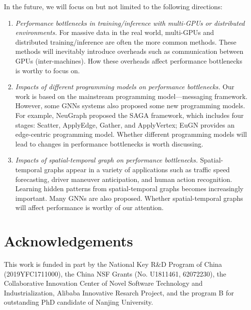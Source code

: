In the future, we will focus on but not limited to the following directions:
%
\begin{enumerate}
    \item \emph{Performance bottlenecks in training/inference with multi-GPUs or distributed environments.}
    For massive data in the real world, multi-GPUs and distributed training/inference are often the more common methods\cite{zhang2020_analysis_neugraph, zhu2019_aligraph}.
    These methods will inevitably introduce overheads such as communication between GPUs (inter-machines). 
    How these overheads affect performance bottlenecks is worthy to focus on.
    \item \emph{Impacts of different programming models on performance bottlenecks.}
    Our work is based on the mainstream programming model---messaging framework.
    However, some GNNs systems also proposed some new programming models.
    For example, NeuGraph\cite{zhang2020_analysis_neugraph} proposed the SAGA framework, 
    which includes four stages: Scatter, ApplyEdge, Gather, and ApplyVertex;
    EuGN\cite{he2019_EnGN} provides an edge-centric programming model.
    Whether different programming models will lead to changes in performance bottlenecks is worth discussing.
    \item \emph{Impacts of spatial-temporal graph on performance bottlenecks.}
    Spatial-temporal graphs appear in a variety of applications such as traffic speed forecasting\cite{li2018_DCRNN}, 
    driver maneuver anticipation\cite{jain2016_SRNN}, and human action recognition\cite{yan2018_STGCN}.
    Learning hidden patterns from spatial-temporal graphs becomes increasingly important.
    Many GNNs are also proposed\cite{li2018_DCRNN, jain2016_SRNN, yan2018_STGCN, seo2018_SSGCN, yu2018_STGCN}.
    Whether spatial-temporal graphs will affect performance is worthy of our attention.
\end{enumerate}
\section*{Acknowledgements}

This work is funded in part by the National Key R\&D Program of China (2019YFC1711000), the China NSF Grants (No. U1811461, 62072230), the Collaborative Innovation Center of Novel Software Technology and Industrialization, Alibaba Innovative Resarch Project, and the program B for outstanding PhD candidate of Nanjing University.

